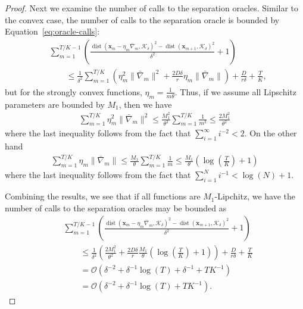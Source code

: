 \documentclass[twoside,11pt,]{article}
\newcommand{\op}[1]{\operatorname{#1}}
\newcommand{\C}[1]{\mathcal{#1}}
\newcommand{\BF}[1]{\mathbf{#1}}
\newcommand{\K}{\C{K}}
\newcommand{\x}{\BF{x}}
\newcommand{\bn}{\bar{\nabla}}
\begin{document}
\begin{proof}
Next we examine the number of calls to the separation oracles. Similar to the convex case, the number of calls to the separation oracle is bounded by Equation~\eqref{eq:oracle-calls}:
\begin{align*}
&\sum_{m = 1}^{T/K - 1}\left( \frac{\op{dist}(\x_m - \eta_m \bn_m,\K_\delta)^2-\op{dist}(\x_{m+1},\K_\delta)^2 }{\delta^2}+1 \right) \nonumber \\
&\qquad\leq \frac{1}{\delta^2} \sum_{m = 1}^{T/K} \left( \eta_m^2 \| \bn_m \|^2 + \frac{2 D \delta}{r} \eta_m \| \bn_m \| \right)
+ \frac{D}{r \delta} 
+ \frac{T}{K},
\end{align*}
but for the strongly convex functions, $\eta_m=\frac{1}{m\theta}$. Thus, if we assume all Lipschitz parameters are bounded by $M_1$, then we have
\begin{align*}
    \sum_{m = 1}^{T/K} \eta_m^2 \| \bn_m \|^2 \leq \frac{M_1^2}{\theta^2} \sum_{m = 1}^{T/K} \frac{1}{m^2} \leq \frac{2 M_1^2 }{\theta^2}
\end{align*}
where the last inequality follows from the fact that $\sum_{i = 1}^\infty i^{-2} < 2$.
On the other hand
\begin{align*}
    \sum_{m = 1}^{T/K} \eta_m \| \bn_m \| 
    \leq \frac{M_1}{\theta} \sum_{m = 1}^{T/K} \frac{1}{m} 
    \leq \frac{M_1}{\theta}\left( \log\left( \frac{T}{K} \right) + 1 \right)
\end{align*}
where the last inequality follows from the fact that $\sum_{i = 1}^N i^{-1} < \log(N) + 1$.

Combining the results, we see that if all functions are $M_1$-Lipchitz, we have the number of calls to the separation oracles may be bounded as 
\begin{align*}
&\sum_{m = 1}^{T/K - 1}\left( \frac{\op{dist}(\x_m - \eta_m \bn_m,\K_\delta)^2-\op{dist}(\x_{m+1},\K_\delta)^2 }{\delta^2}+1 \right) \nonumber \\
&\qquad\leq \frac{1}{\delta^2}  \left( \frac{2 M_1^2}{\theta^2} +  \frac{2 D \delta}{r} \frac{M_1}{\theta}\left( \log\left( \frac{T}{K} \right) + 1 \right) \right)
+ \frac{D}{r \delta} 
+ \frac{T}{K} \\
&\qquad = \C{O}\left( \delta^{-2}
+ \delta^{-1}\log(T)
+ \delta^{-1}
+ T K^{-1} \right) \\
&\qquad = \C{O}\left( \delta^{-2}
+ \delta^{-1}\log(T)
+ T K^{-1} \right).
\end{align*}

\end{proof}
\end{document}
